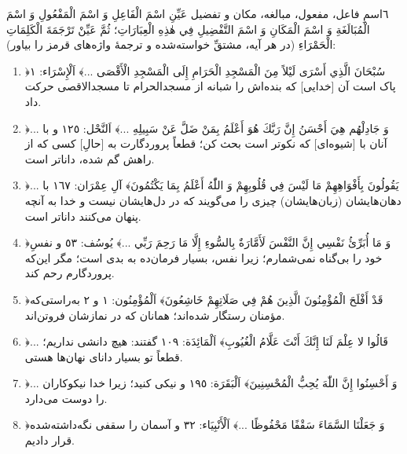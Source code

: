\begin{JTamrin}{٦}{اسمِ فاعل، مفعول، مبالغه، مکان و تفضیل}
عَيِّنِ اسْمَ الْفَاعِلِ وَ اسْمَ الْمَفْعُولِ وَ اسْمَ الْمُبَالَغَةِ وَ
اسْمَ الْمَكَانِ وَ اسْمَ التَّفْضِيلِ فِي هٰذِهِ الْعِبَارَاتِ؛ ثُمَّ عَيِّنْ
تَرْجَمَةَ الْكَلِمَاتِ الْحَمْرَاءِ (در هر آیه، مشتقِّ خواسته‌شده و ترجمهٔ
واژه‌های قرمز را بیاور):

\begin{enumerate}
  \item ﴿سُبْحَانَ الَّذِي أَسْرَى لَيْلاً مِنَ الْمَسْجِدِ
        الْحَرَامِ إِلَى الْمَسْجِدِ الْأَقْصَى ...﴾ اَلْإِسْرَاء: ١
        {}
        پاک است آن [خدایی] که بنده‌اش را شبانه از مسجدالحرام تا مسجدالاقصی
        حرکت داد.
  \item ﴿... وَ جَادِلْهُم هِيَ أَحْسَنُ إِنَّ رَبَّكَ هُوَ
        أَعْلَمُ بِمَنْ ضَلَّ عَنْ سَبِيلِهِ ...﴾ اَلنَّحْل: ١٢٥
        {}
        و با آنان با [شیوه‌ای] که نکوتر است بحث کن؛ قطعاً پروردگارت به [حالِ]
        کسی که از راهش گم شده، داناتر است.
  \item ﴿... يَقُولُونَ بِأَفْوَاهِهِمْ مَا لَيْسَ فِي قُلُوبِهِمْ وَ اللّٰهُ
        أَعْلَمُ بِمَا يَكْتُمُونَ﴾ آلِ عِمْرَان: ١٦٧
        {}
        با دهان‌هایشان (زبان‌هایشان) چیزی را می‌گویند که در دل‌هایشان نیست و
        خدا به آنچه پنهان می‌کنند داناتر است.
  \item ﴿وَ مَا أُبَرِّئُ نَفْسِي إِنَّ النَّفْسَ لَأَمَّارَةٌ
        بِالسُّوءِ إِلَّا مَا رَحِمَ رَبِّي ...﴾ يُوسُف: ٥٣
        {}
        و نفسِ خود را بی‌گناه نمی‌شمارم؛ زیرا نفس، بسیار فرمان‌ده به بدی است؛
        مگر این‌که پروردگارم رحم کند. 
  \item ﴿قَدْ أَفْلَحَ الْمُؤْمِنُونَ الَّذِينَ هُمْ فِي صَلَاتِهِمْ
        خَاشِعُونَ﴾ اَلْمُؤْمِنُون: ١ و ٢ {}
        به‌راستی‌که مؤمنان رستگار شده‌اند؛ همانان که در نمازشان فروتن‌اند.
  \item ﴿... قَالُوا لا عِلْمَ لَنَا إِنَّكَ أَنْتَ عَلَّامُ الْغُيُوبِ﴾
        اَلْمَائِدَة: ١٠٩ {}
        گفتند: هیچ دانشی نداریم؛ قطعاً تو بسیار دانای نهان‌ها هستی.
  \item ﴿... وَ أَحْسِنُوا إِنَّ اللّٰهَ يُحِبُّ الْمُحْسِنِينَ﴾
        اَلْبَقَرَة: ١٩٥ {}
        و نیکی کنید؛ زیرا خدا نیکوکاران را دوست می‌دارد.
  \item ﴿وَ جَعَلْنَا السَّمَاءَ سَقْفًا مَحْفُوظًا ...﴾ اَلْأَنْبِيَاء: ٣٢
        {}
        و آسمان را سقفی نگه‌داشته‌شده قرار دادیم.
\end{enumerate}
\end{JTamrin}

